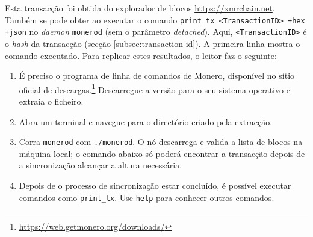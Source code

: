 \begin{appendices}
Esta transacção foi obtida do explorador de blocos
\url{https://xmrchain.net}. Também se pode obter ao executar o comando
{\tt print\_tx <TransactionID> +hex +json} no {\em daemon} {\tt monerod}
(sem o parâmetro {\em detached}). Aqui, {\tt <TransactionID>} é o \emph{hash}
da transacção (secção \ref{subsec:transaction-id}). A primeira linha mostra o
comando executado.
Para replicar estes resultados, o leitor faz o seguinte:
\begin{enumerate}
    \item É preciso o programa de linha de comandos de Monero, disponível no
    sítio oficial de descargas.\footnote{\url{https://web.getmonero.org/downloads/}}
    Descarregue a versão para o seu sistema operativo e extraia o ficheiro.
    \item Abra um terminal e navegue para o directório criado pela extracção.
    \item Corra {\tt monerod} com {\tt ./monerod}. O nó descarrega e valida a
    lista de blocos na máquina local; o comando abaixo só poderá encontrar a
    transacção depois de a sincronização alcançar a altura necessária.
    \item Depois de o processo de sincronização estar concluído, é possível
    executar comandos como {\tt print\_tx}. Use {\tt help} para conhecer outros
    comandos.
\end{enumerate}


\end{appendices}
